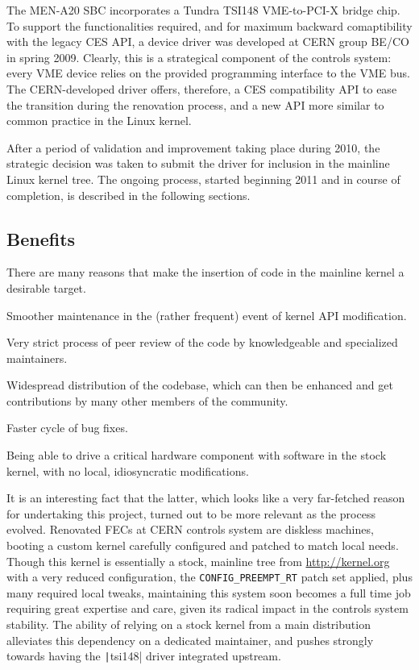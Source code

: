 \documentclass{JAC2003}
\begin{document}
The MEN-A20 SBC incorporates a Tundra TSI148 VME-to-PCI-X bridge chip.
To support the functionalities required, and for maximum backward
comaptibility with the legacy CES API, a device driver was developed 
at CERN group BE/CO in spring 2009. Clearly, this is a strategical
component of the controls system: every VME device relies on the
provided programming interface to the VME bus. The CERN-developed driver
offers, therefore, a CES compatibility API to ease the transition during
the renovation process, and a new API more similar to common practice
in the Linux kernel.

After a period of validation and improvement taking place during 2010,
the strategic decision was taken to submit the driver for
inclusion in the mainline Linux kernel tree. The ongoing process, started
beginning 2011 and in course of completion, is described in the following
sections.

\subsection{Benefits}

There are many reasons that make the insertion of code in the mainline
kernel a desirable target.

\begin{Itemize}
\item Smoother maintenance in the (rather frequent) event of kernel API
    modification.
\item Very strict process of peer review of the code by knowledgeable
    and specialized maintainers.
\item Widespread distribution of the codebase, which can then be
    enhanced and get contributions by many other members of the community.
\item Faster cycle of bug fixes.
\item Being able to drive a critical hardware component with software
    in the stock kernel, with no local, idiosyncratic modifications.
\end{Itemize}

It is an interesting fact that the latter, which looks like a very
far-fetched reason for undertaking this project, turned out to be more
relevant as the process evolved. Renovated FECs at CERN controls system
are diskless machines, booting a custom kernel carefully configured and
patched to match local needs. Though this kernel is essentially a stock,
mainline tree from \url{http://kernel.org} with a very reduced 
configuration, the \verb|CONFIG_PREEMPT_RT|
patch set applied, plus many required local
tweaks, maintaining this system soon becomes a full time job requiring
great expertise and care, given its radical impact in the controls
system stability. The ability of relying on a stock kernel from a main
distribution alleviates this dependency on a dedicated maintainer, and
pushes strongly towards having the \texttt|tsi148| driver integrated
upstream.
\end{document}
